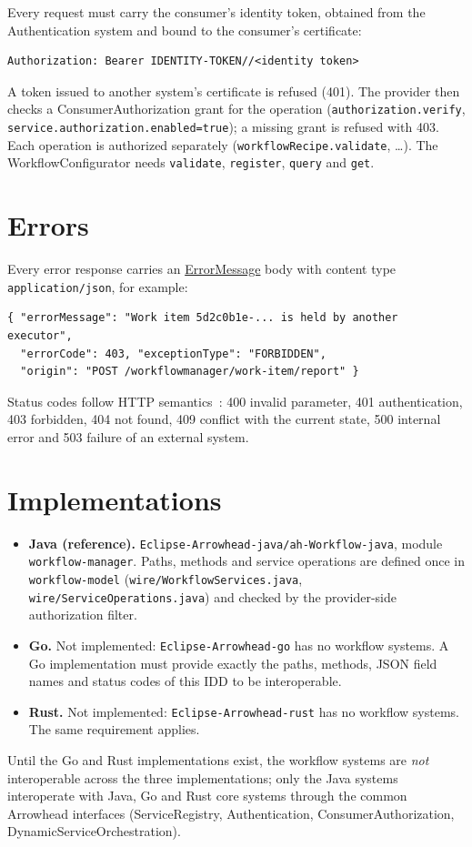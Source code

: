 \documentclass[a4paper]{arrowhead}
\newcommand{\mref}[1]{{\textcolor{ArrowheadPurple}{\hyperref[sec:model:#1]{#1}}}}
\begin{document}
Every request must carry the consumer's identity token, obtained from the Authentication system and bound to the
consumer's certificate:
\begin{lstlisting}
Authorization: Bearer IDENTITY-TOKEN//<identity token>
\end{lstlisting}
A token issued to another system's certificate is refused (401). The provider then checks a ConsumerAuthorization
grant for the operation (\texttt{authorization.verify}, \texttt{service.authorization.enabled=true}); a missing grant is
refused with 403. Each operation is authorized separately (\texttt{workflowRecipe.validate}, \ldots). The WorkflowConfigurator needs \texttt{validate}, \texttt{register}, \texttt{query} and \texttt{get}.


\section{Errors}
\label{sec:errors}
Every error response carries an \mref{ErrorMessage} body with content type \texttt{application/json}, for example:
\begin{lstlisting}
{ "errorMessage": "Work item 5d2c0b1e-... is held by another executor",
  "errorCode": 403, "exceptionType": "FORBIDDEN",
  "origin": "POST /workflowmanager/work-item/report" }
\end{lstlisting}
Status codes follow HTTP semantics~\cite{rfc9110}: 400 invalid parameter, 401 authentication, 403 forbidden, 404 not
found, 409 conflict with the current state, 500 internal error and 503 failure of an external system.


\section{Implementations}
\label{sec:implementations}
\begin{itemize}
\item \textbf{Java (reference).} \texttt{Eclipse-Arrowhead-java/ah-Workflow-java}, module \texttt{workflow-manager}. Paths, methods and service
operations are defined once in \texttt{workflow-model} (\texttt{wire/WorkflowServices.java}, \texttt{wire/ServiceOperations.java}) and checked by the provider-side authorization filter.
\item \textbf{Go.} Not implemented: \texttt{Eclipse-Arrowhead-go} has no workflow systems. A Go implementation must
provide exactly the paths, methods, JSON field names and status codes of this IDD to be interoperable.
\item \textbf{Rust.} Not implemented: \texttt{Eclipse-Arrowhead-rust} has no workflow systems. The same requirement applies.
\end{itemize}
Until the Go and Rust implementations exist, the workflow systems are \emph{not} interoperable across the three
implementations; only the Java systems interoperate with Java, Go and Rust core systems through the common Arrowhead
interfaces (ServiceRegistry, Authentication, ConsumerAuthorization, DynamicServiceOrchestration).
\end{document}
